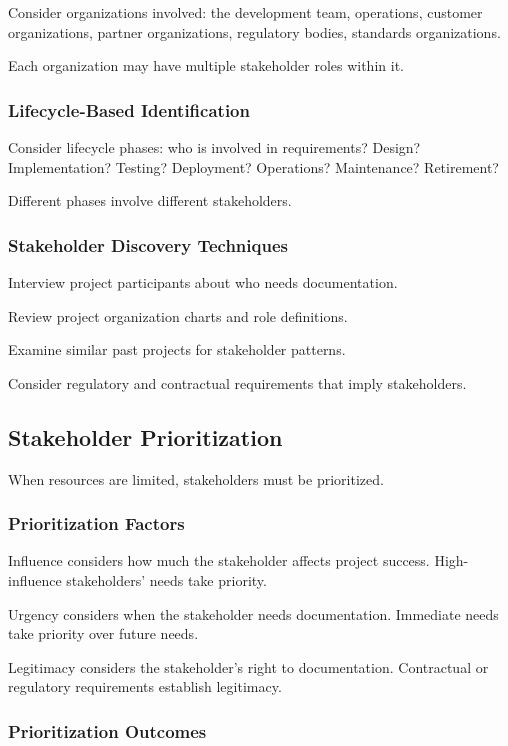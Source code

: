 \documentclass[11pt]{article}
\begin{document}
Consider organizations involved: the development team, operations, customer organizations, partner organizations, regulatory bodies, standards organizations.

Each organization may have multiple stakeholder roles within it.

\subsubsection{Lifecycle-Based Identification}

Consider lifecycle phases: who is involved in requirements? Design? Implementation? Testing? Deployment? Operations? Maintenance? Retirement?

Different phases involve different stakeholders.

\subsubsection{Stakeholder Discovery Techniques}

Interview project participants about who needs documentation.

Review project organization charts and role definitions.

Examine similar past projects for stakeholder patterns.

Consider regulatory and contractual requirements that imply stakeholders.

\subsection{Stakeholder Prioritization}

When resources are limited, stakeholders must be prioritized.

\subsubsection{Prioritization Factors}

Influence considers how much the stakeholder affects project success. High-influence stakeholders' needs take priority.

Urgency considers when the stakeholder needs documentation. Immediate needs take priority over future needs.

Legitimacy considers the stakeholder's right to documentation. Contractual or regulatory requirements establish legitimacy.

\subsubsection{Prioritization Outcomes}
\end{document}
